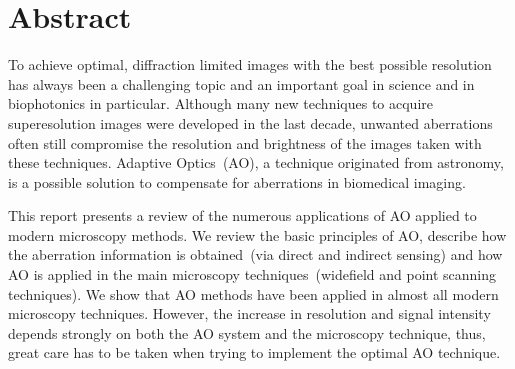 \section*{Abstract}

To achieve optimal, diffraction limited images with the best possible resolution has always been a challenging topic and an important goal in science and in biophotonics in particular. Although many new techniques to acquire superesolution images were developed in the last decade, unwanted aberrations often still compromise the resolution and brightness of the images taken with these techniques. Adaptive Optics~(AO), a technique originated from astronomy, is a possible solution to compensate for aberrations in biomedical imaging. 

This report presents a review of the numerous applications of AO applied to modern microscopy methods. We review the basic principles of AO, describe how the aberration information is obtained~(via direct and indirect sensing) and how AO is applied in the main microscopy techniques~(widefield and point scanning techniques). We show that AO methods have been applied in almost all modern microscopy techniques. However, the increase in resolution and signal intensity depends strongly on both the AO system and the microscopy technique, thus, great care has to be taken when trying to implement the optimal AO technique.